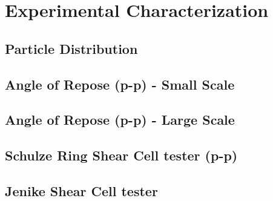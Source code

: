 
\chapter{Experimental Characterization}
\label{cap:experimentalcharacterization}

\lipsum[1]



\section{Particle Distribution}
\label{sec:particledistribution}

\lipsum[1]



\section{Angle of Repose (p-p) - Small Scale}
\label{sec:aor}


\lipsum[1]

\section{Angle of Repose (p-p) - Large Scale}
\label{sec:aorlargescale}


\lipsum[1]



\section{Schulze Ring Shear Cell tester (p-p)}
\label{sec:SRSCT}

\lipsum[1]

\section{Jenike Shear Cell tester}
\label{sec:jsct}

\lipsum[1]